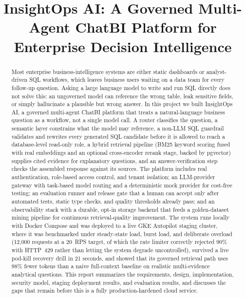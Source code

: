\documentclass[conference]{IEEEtran}
\begin{document}
\title{InsightOps AI: A Governed Multi-Agent ChatBI Platform for Enterprise Decision Intelligence}

\author{
}

\maketitle

\begin{abstract}
Most enterprise business-intelligence systems are either static dashboards or
analyst-driven SQL workflows, which leaves business users waiting on a data
team for every follow-up question. Asking a large language model to write
and run SQL directly does not solve this: an ungoverned model can reference
the wrong table, leak sensitive fields, or simply hallucinate a plausible
but wrong answer. In this project we built InsightOps AI, a governed
multi-agent ChatBI platform that treats a natural-language business
question as a workflow, not a single model call. A router classifies the
question, a semantic layer constrains what the model may reference, a
non-LLM SQL guardrail validates and rewrites every generated SQL candidate
before it is allowed to reach a database-level read-only role, a hybrid
retrieval pipeline (BM25 keyword scoring fused with real embeddings and an
optional cross-encoder rerank stage, backed by pgvector) supplies cited
evidence for explanatory questions, and an answer-verification step checks
the assembled response against its sources. The platform includes real
authentication, role-based access control, and tenant isolation; an
LLM-provider gateway with task-based model routing and a deterministic
mock provider for cost-free testing; an evaluation runner and release gate
that a human can accept only after automated tests, static type checks, and
quality thresholds already pass; and an observability stack with a durable,
opt-in storage backend that feeds a golden-dataset mining pipeline for
continuous retrieval-quality improvement. The system runs locally with
Docker Compose and was deployed to a live GKE Autopilot staging cluster,
where it was benchmarked under steady-state load, burst load, and
deliberate overload (12{,}000 requests at a 20~RPS target, of which the
rate limiter correctly rejected 90\% with HTTP~429 rather than letting the
system degrade uncontrolled), survived a live pod-kill recovery drill in
21 seconds, and showed that its governed retrieval path uses 98\% fewer
tokens than a naive full-context baseline on realistic multi-evidence
analytical questions. This report summarizes the requirements, design,
implementation, security model, staging deployment results, and
evaluation results, and discusses the gaps that remain before this is a
fully production-hardened cloud service.
\end{abstract}
\end{document}
